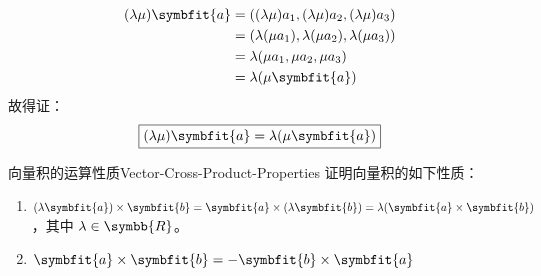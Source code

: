 \begin{myproof}

    \begin{equation*}
        \begin{aligned}
            (\lambda\mu)\symbfit{a} & = ((\lambda\mu)a_1, (\lambda\mu)a_2, (\lambda\mu)a_3)    \\
                                    & = (\lambda(\mu a_1), \lambda(\mu a_2), \lambda(\mu a_3)) \\
                                    & = \lambda(\mu a_1, \mu a_2, \mu a_3)                     \\
                                    & = \lambda(\mu\symbfit{a})
        \end{aligned}
    \end{equation*}
    故得证：
    \begin{equation*}
        \boxed{(\lambda\mu)\symbfit{a} = \lambda(\mu\symbfit{a})}
    \end{equation*}
\end{myproof}


\begin{problem}{向量积的运算性质}{Vector-Cross-Product-Properties}
    证明向量积的如下性质：
    \begin{enumerate}
        \item $(\lambda\symbfit{a}) \times \symbfit{b} = \symbfit{a} \times (\lambda\symbfit{b}) = \lambda(\symbfit{a} \times \symbfit{b})$，其中 $\lambda \in \symbb{R}$。
        \item $\symbfit{a} \times \symbfit{b} = -\symbfit{b} \times \symbfit{a}$
    \end{enumerate}
\end{problem}

